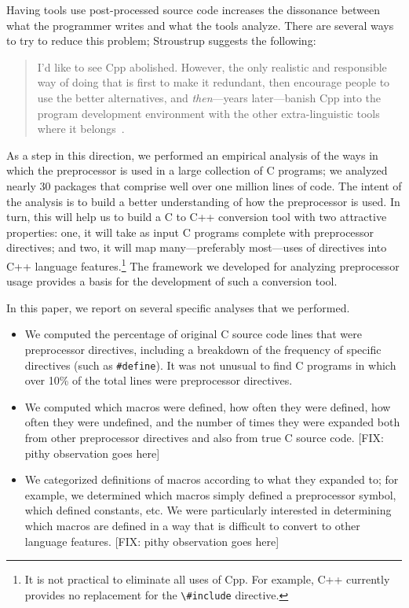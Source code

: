 Having tools use post-processed source code increases the dissonance
between what the programmer writes and what the tools analyze.  There
are several ways to try to reduce this problem; Stroustrup suggests
the following:
\begin{quote}
I'd like to see Cpp abolished.  However, the only realistic and
responsible way of doing that is first to make it redundant, then
encourage people to use the better alternatives, and {\em
then\/}---years later---banish Cpp into the program development
environment with the other extra-linguistic tools where it
belongs~\cite[p.~426]{Stroustrup-DesignEvolution}.
\end{quote}

As a step in this direction, we performed an empirical analysis of the
ways in which the preprocessor is used in a large collection of C
programs; we analyzed nearly 30 packages that comprise well over one
million lines of code.  The intent of the analysis is to build a better
understanding of how the preprocessor is used.  In turn, this will help
us to build a C to C++ conversion tool with two attractive properties:
one, it will take as input C programs complete with preprocessor
directives; and two, it will map many---preferably most---uses of
directives into C++ language features.\footnote{It is not practical to
  eliminate all uses of Cpp.  For example, C++ currently provides no
  replacement for the \verb+\#include+ directive.} The framework we
developed for analyzing preprocessor usage provides a basis for the
development of such a conversion tool.

In this paper, we report on several specific analyses that we
performed.  
\begin{itemize}

\item We computed the percentage of original C source code lines that
were preprocessor directives, including a breakdown of the frequency
of specific directives (such as \verb+#define+).  It was not unusual
to find C programs in which over 10\% of the total lines were
preprocessor directives.

\item We computed which macros were defined, how often they were
defined, how often they were undefined, and the number of times they
were expanded both from other preprocessor directives and also from
true C source code.  [FIX: pithy observation goes here]

\item We categorized definitions of macros according to what they
      expanded to; for example, we determined which macros simply
      defined a preprocessor symbol, which defined constants, etc.  We
      were particularly interested in determining which macros are
      defined in a way that is difficult to convert to other language
      features.  [FIX: pithy observation goes here]

\end{itemize}

